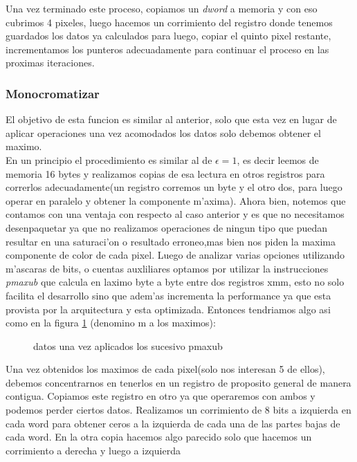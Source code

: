Una vez terminado este proceso, copiamos un \textit{dword} a memoria y con eso cubrimos 4 pixeles,
luego hacemos un corrimiento del registro donde tenemos guardados los datos ya calculados para luego,
copiar el quinto pixel restante, incrementamos los punteros adecuadamente para continuar el 
proceso en las proximas iteraciones.\\


\subsubsection{Monocromatizar \protect{$\epsilon = \infty $} }
El objetivo de esta funcion es similar al anterior, solo que esta vez en lugar de aplicar operaciones
una vez acomodados los datos solo debemos obtener el maximo.\\
En un principio el procedimiento es similar al de  $\epsilon= 1$, es decir leemos de memoria 16 bytes
y realizamos copias de esa lectura en otros registros para correrlos adecuadamente(un registro corremos un byte 
 y el otro dos, para luego operar en paralelo y obtener la componente m'axima).  Ahora bien, 
notemos que contamos con una ventaja con respecto al caso anterior y es que no necesitamos desenpaquetar
ya que no realizamos operaciones de ningun tipo que puedan resultar en una saturaci'on o 
resultado erroneo,mas bien nos piden la maxima componente de color de cada pixel. Luego de analizar 
varias opciones utilizando m'ascaras de bits, o cuentas auxliliares optamos por utilizar la instrucciones
\textit{pmaxub} que calcula en laximo byte a byte entre dos registros xmm, esto no solo facilita 
el desarrollo sino que adem'as incrementa la performance ya que esta provista por la arquitectura y 
esta optimizada. Entonces tendriamos algo asi como en la figura \ref{est:m-seis} (denomino m a los maximos):\\
\begin{figure}[hb]
\caption{datos una vez aplicados los sucesivo pmaxub}
\label{est:m-seis}
\end{figure}
Una vez obtenidos los maximos de cada pixel(solo nos interesan 5 de ellos), debemos concentrarnos en
tenerlos en un registro de proposito general de manera contigua. 
Copiamos este registro en otro ya que operaremos con ambos y podemos perder ciertos datos. Realizamos un 
corrimiento de 8 bits a izquierda en cada word para obtener ceros a la izquierda de cada una de las partes bajas de
cada word. En la otra copia hacemos algo parecido solo que hacemos un corrimiento a derecha y luego a izquierda
